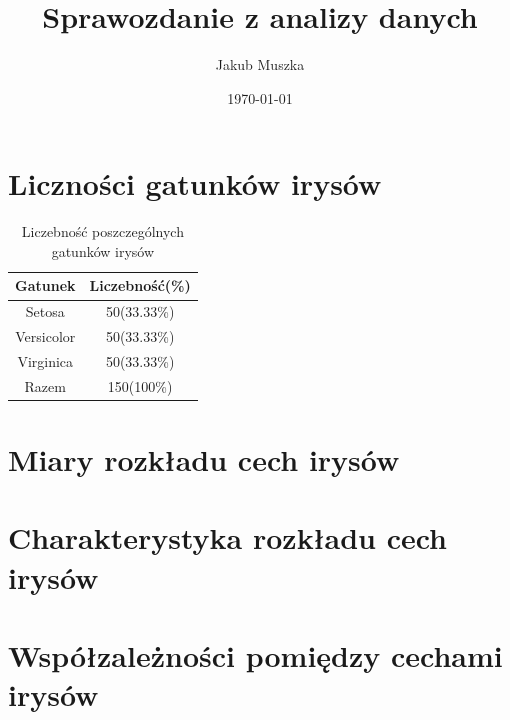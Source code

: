 \documentclass[12pt,a4paper]{article}
\title{Sprawozdanie z analizy danych}
\author{Jakub Muszka}
\date{\today}
\begin{document}
\maketitle

\tableofcontents
\newpage

\section{Liczności gatunków irysów}

\begin{table}[htbp]
    \centering
    \caption{Liczebność poszczególnych gatunków irysów}
    \label{tab:wyniki}
    \begin{tabular}{|c|c|}
        \hline
        Gatunek & Liczebność(\%) \\
        \hline
        Setosa & 50(33.33\%) \\
        Versicolor & 50(33.33\%) \\
        Virginica & 50(33.33\%) \\
        Razem & 150(100\%) \\
        \hline
    \end{tabular}
\end{table}

\section{Miary rozkładu cech irysów}

\begin{table}
    \caption{Miary rozkładu dla cech irysów}
    \label{tab:miary}
\end{table}

\section{Charakterystyka rozkładu cech irysów}

\section{Współzależności pomiędzy cechami irysów}
\end{document}
